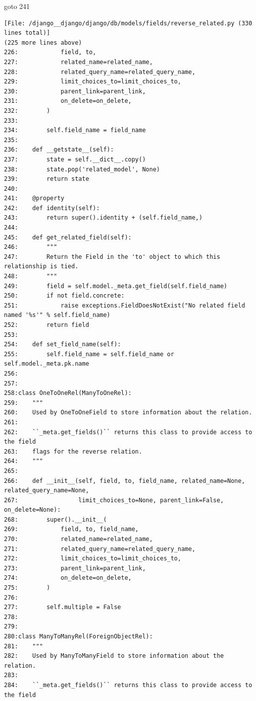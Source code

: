 {\begin{agentbox}
\hrulefill
\begin{CodeVerbatim}[breaklines=true, breakanywhere=true]
goto 241
\end{CodeVerbatim}
\end{agentbox}
\begin{observationbox}\begin{Verbatim}[breaklines=true, breakanywhere=true]
[File: /django__django/django/db/models/fields/reverse_related.py (330 lines total)]
(225 more lines above)
226:            field, to,
227:            related_name=related_name,
228:            related_query_name=related_query_name,
229:            limit_choices_to=limit_choices_to,
230:            parent_link=parent_link,
231:            on_delete=on_delete,
232:        )
233:
234:        self.field_name = field_name
235:
236:    def __getstate__(self):
237:        state = self.__dict__.copy()
238:        state.pop('related_model', None)
239:        return state
240:
241:    @property
242:    def identity(self):
243:        return super().identity + (self.field_name,)
244:
245:    def get_related_field(self):
246:        """
247:        Return the Field in the 'to' object to which this relationship is tied.
248:        """
249:        field = self.model._meta.get_field(self.field_name)
250:        if not field.concrete:
251:            raise exceptions.FieldDoesNotExist("No related field named '%s'" % self.field_name)
252:        return field
253:
254:    def set_field_name(self):
255:        self.field_name = self.field_name or self.model._meta.pk.name
256:
257:
258:class OneToOneRel(ManyToOneRel):
259:    """
260:    Used by OneToOneField to store information about the relation.
261:
262:    ``_meta.get_fields()`` returns this class to provide access to the field
263:    flags for the reverse relation.
264:    """
265:
266:    def __init__(self, field, to, field_name, related_name=None, related_query_name=None,
267:                 limit_choices_to=None, parent_link=False, on_delete=None):
268:        super().__init__(
269:            field, to, field_name,
270:            related_name=related_name,
271:            related_query_name=related_query_name,
272:            limit_choices_to=limit_choices_to,
273:            parent_link=parent_link,
274:            on_delete=on_delete,
275:        )
276:
277:        self.multiple = False
278:
279:
280:class ManyToManyRel(ForeignObjectRel):
281:    """
282:    Used by ManyToManyField to store information about the relation.
283:
284:    ``_meta.get_fields()`` returns this class to provide access to the field

\end{Verbatim}
\end{observationbox}}
